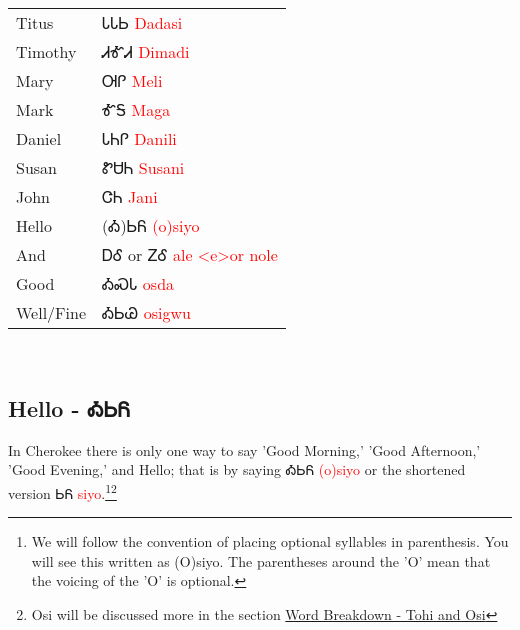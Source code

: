 \begin{minipage}{\linewidth}
\begin{tabular}{p{3cm} p{11cm}}
Titus & ᏓᏓᏏ 
 \newline \textcolor{red}{Dadasi}\\
Timothy & ᏗᎹᏗ 
 \newline \textcolor{red}{Dimadi}\\
Mary & ᎺᎵ 
 \newline \textcolor{red}{Meli}\\
Mark & ᎹᎦ 
 \newline \textcolor{red}{Maga}\\
Daniel & ᏓᏂᎵ 
 \newline \textcolor{red}{Danili}\\
Susan & ᏑᏌᏂ 
 \newline \textcolor{red}{Susani}\\
John & ᏣᏂ 
 \newline \textcolor{red}{Jani}\\
Hello & (Ꭳ)ᏏᏲ 
 \newline \textcolor{red}{(o)siyo}\\
And & ᎠᎴ 
  or ᏃᎴ 
 \newline \textcolor{red}{ale <e>or nole}\\
Good & ᎣᏍᏓ 
 \newline \textcolor{red}{osda}\\
Well/Fine & ᎣᏏᏊ 
 \newline \textcolor{red}{osigwu}\\
\end{tabular}
\end{minipage}

\
\subsection{Hello - ᎣᏏᏲ}
In Cherokee there is only one way to say 'Good Morning,' 'Good Afternoon,' 'Good Evening,' and Hello; that is by saying ᎣᏏᏲ \textcolor{red}{(o)siyo} or the shortened version ᏏᏲ \textcolor{red}{siyo}.\footnote{We will follow the convention of placing optional syllables in parenthesis.  You will see this written as (O)siyo.  The parentheses around the 'O' mean that the voicing of the 'O' is optional.}\footnote{Osi will be discussed more in the section \hyperref[sec:wordBreakdownTohiOsi]{Word Breakdown - Tohi and Osi}}

